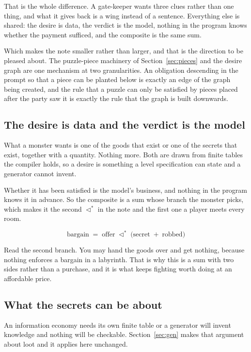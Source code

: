 \documentclass[11pt,a4paper]{article}
\newcommand{\seqb}{\lhd^{\ast}}
\begin{document}
That is the whole difference. A gate-keeper wants three clues rather than one thing, and what it gives
back is a wing instead of a sentence. Everything else is shared: the desire is data, the verdict
is the model, nothing in the program knows whether the payment sufficed, and the composite is the
same sum.

\begin{sectionbox}
Which makes the note smaller rather than larger, and that is the direction to be pleased about.
The puzzle-piece machinery of Section~\ref{sec:pieces} and the desire graph are one mechanism at
two granularities. An obligation descending in the prompt so that a piece can be planted below is
exactly an edge of the graph being created, and the rule that a puzzle can only be satisfied by
pieces placed after the party saw it is exactly the rule that the graph is built downwards.
\end{sectionbox}

\subsection{The desire is data and the verdict is the model}

What a monster wants is one of the goods that exist or one of the secrets that exist, together
with a quantity. Nothing more. Both are drawn from finite tables the compiler holds, so a desire
is something a level specification can state and a generator cannot invent.

Whether it has been satisfied is the model's business, and nothing in the program knows it in
advance. So the composite is a sum whose branch the monster picks, which makes it the second
$\seqb$ in the note and the first one a player meets every room.

\[ \text{bargain} \;=\; \text{offer} \;\seqb\; \bigl( \text{secret} \;+\; \text{robbed} \bigr) \]

Read the second branch. You may hand the goods over and get nothing, because nothing enforces a
bargain in a labyrinth. That is why this is a sum with two sides rather than a purchase, and it is
what keeps fighting worth doing at an affordable price.

\subsection{What the secrets can be about}

An information economy needs its own finite table or a generator will invent knowledge and nothing
will be checkable. Section~\ref{sec:gen} makes that argument about loot and it applies here
unchanged.
\end{document}
